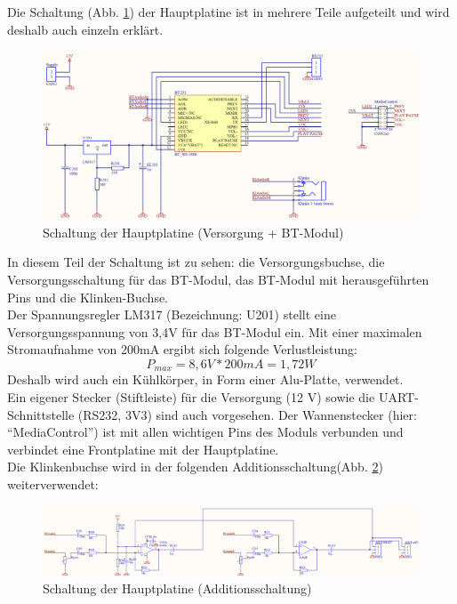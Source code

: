 Die Schaltung (Abb. \ref{fig:4.1.8.2.1}) der Hauptplatine ist in mehrere Teile aufgeteilt und wird deshalb auch einzeln erklärt.
\begin{figure} [H]
	\centering
	\includegraphics[width=1\textwidth]{img/BTModul/hauptboard_sch1.png}
	\caption{Schaltung der Hauptplatine (Versorgung + BT-Modul)}\label {fig:4.1.8.2.1}
\end{figure} 
In diesem Teil der Schaltung ist zu sehen: die Versorgungsbuchse, die Versorgungsschaltung für das BT-Modul, das BT-Modul mit herausgeführten Pins und die Klinken-Buchse.
\\
Der Spannungsregler LM317 (Bezeichnung: U201) stellt eine Versorgungsspannung von 3,4V für das BT-Modul ein. 
Mit einer maximalen Stromaufnahme von 200mA ergibt sich folgende Verlustleistung:
\begin{equation}
	P_{max} = 8,6 V * 200 mA = 1,7 2W
\end{equation}
Deshalb wird auch ein Kühlkörper, in Form einer Alu-Platte, verwendet.
\\
Ein eigener Stecker (Stiftleiste) für die Versorgung (12 V) sowie die UART-Schnittstelle (RS232, 3V3) sind auch vorgesehen.
Der Wannenstecker (hier: \enquote{MediaControl}) ist mit allen wichtigen Pins des Moduls verbunden und verbindet eine Frontplatine mit der Hauptplatine.
\\
Die Klinkenbuchse wird in der folgenden Additionsschaltung(Abb. \ref {fig:4.1.8.2.2}) weiterverwendet:
\begin{figure} [H]
	\centering
	\includegraphics[width=1\textwidth]{img/BTModul/hauptboard_sch2.png}
	\caption{Schaltung der Hauptplatine (Additionsschaltung)}\label {fig:4.1.8.2.2}
\end{figure}
